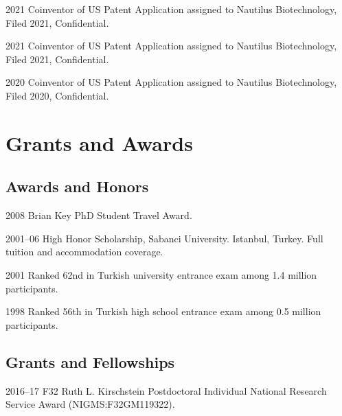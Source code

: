 \documentclass[12pt,letterpaper]{report}
\begin{document}
    \begin{tablist}

        \item[2021] \tab{}Coinventor of US Patent Application assigned to Nautilus Biotechnology, Filed 2021, Confidential.
        \item[2021] \tab{}Coinventor of US Patent Application assigned to Nautilus Biotechnology, Filed 2021, Confidential.
        \item[2020] \tab{}Coinventor of US Patent Application assigned to Nautilus Biotechnology, Filed 2020, Confidential.

    \end{tablist}

    \section*{Grants and Awards}

    \subsection*{Awards and Honors}

    \begin{tablist}

        \item[2008] \tab{}Brian Key PhD Student Travel Award.
        \item[2001--06] \tab{}High Honor Scholarship, Sabanci University. Istanbul, Turkey. Full tuition and accommodation coverage.
        \item[2001] \tab{}Ranked 62nd in Turkish university entrance exam among 1.4 million participants.
        \item[1998] \tab{}Ranked 56th in Turkish high school entrance exam among 0.5 million participants.

    \end{tablist}

    \subsection*{Grants and Fellowships}

    \begin{tablist}

        \item[2016--17] \tab{} F32 Ruth L. Kirschstein Postdoctoral Individual National Research Service Award (NIGMS:F32GM119322). 

    \end{tablist}
\end{document}
